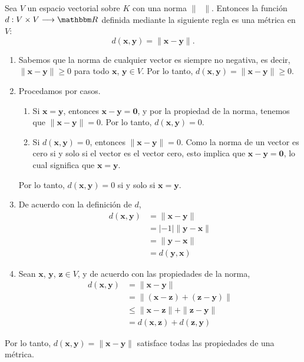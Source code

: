 \begin{examplebox}{}{}
    Sea $V$ un espacio vectorial sobre $K$ con una norma $\| \phantom{x} \|$. Entonces la función $d: V \times V \longrightarrow \RR$ definida mediante la siguiente regla es una métrica en $V$:
    $$d(\mathbf{x}, \mathbf{y}) = \| \mathbf{x} - \mathbf{y} \|.$$

    \tcblower
    \demostracion
    \begin{enumerate}[label=\roman*), topsep=6pt, itemsep=0pt]
        \item Sabemos que la norma de cualquier vector es siempre no negativa, es decir, $\| \mathbf{x} - \mathbf{y} \| \geq 0$ para todo $\mathbf{x}$, $\mathbf{y} \in V$. Por lo tanto, $d(\mathbf{x}, \mathbf{y}) = \| \mathbf{x} - \mathbf{y} \| \geq 0$.
        \item Procedamos por casos.
        \begin{enumerate}
            \item Si $\mathbf{x} = \mathbf{y}$, entonces $\mathbf{x} - \mathbf{y} = \mathbf{0}$, y por la propiedad de la norma, tenemos que $\| \mathbf{x} - \mathbf{y} \| = 0$. Por lo tanto, $d(\mathbf{x}, \mathbf{y}) = 0$.
            \item Si $d(\mathbf{x}, \mathbf{y}) = 0$, entonces $\| \mathbf{x} - \mathbf{y} \| = 0$. Como la norma de un vector es cero si y solo si el vector es el vector cero, esto implica que $\mathbf{x} - \mathbf{y} = \mathbf{0}$, lo cual significa que $\mathbf{x} = \mathbf{y}$.
        \end{enumerate}
        Por lo tanto, $d(\mathbf{x}, \mathbf{y}) = 0$ si y solo si $\mathbf{x} = \mathbf{y}$.
        \item De acuerdo con la definición de $d$,
        \begin{align*}
            d(\mathbf{x}, \mathbf{y}) & = \| \mathbf{x} - \mathbf{y} \| \\
            & = |-1| \| \mathbf{y} - \mathbf{x} \| \\
            & = \| \mathbf{y} - \mathbf{x} \| \\
            & = d(\mathbf{y}, \mathbf{x})
        \end{align*}
        \item Sean $\mathbf{x}$, $\mathbf{y}$, $\mathbf{z} \in V$, y de acuerdo con las propiedades de la norma,
        \begin{align*}
            d(\mathbf{x}, \mathbf{y}) & = \| \mathbf{x} - \mathbf{y} \| \\
            & = \| (\mathbf{x} - \mathbf{z}) + (\mathbf{z} - \mathbf{y}) \| \\
            & \leq \| \mathbf{x} - \mathbf{z} \| + \| \mathbf{z} - \mathbf{y} \| \\
            & = d(\mathbf{x}, \mathbf{z}) + d(\mathbf{z}, \mathbf{y})
        \end{align*}
    \end{enumerate}
    Por lo tanto, $d(\mathbf{x}, \mathbf{y}) = \| \mathbf{x} - \mathbf{y} \|$ satisface todas las propiedades de una métrica.
\end{examplebox}

